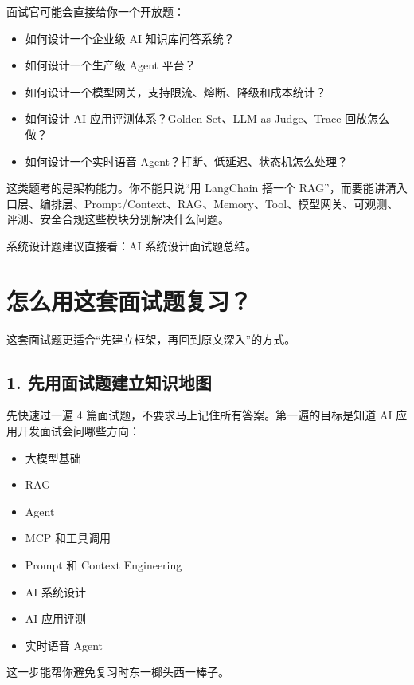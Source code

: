 \documentclass[9pt,a4paper,twocolumn]{ctexart}
\begin{document}
面试官可能会直接给你一个开放题：


\begin{itemize}[itemsep=1pt, topsep=2pt]
  \item 如何设计一个企业级 AI 知识库问答系统？
  \item 如何设计一个生产级 Agent 平台？
  \item 如何设计一个模型网关，支持限流、熔断、降级和成本统计？
  \item 如何设计 AI 应用评测体系？Golden Set、LLM-as-Judge、Trace 回放怎么做？
  \item 如何设计一个实时语音 Agent？打断、低延迟、状态机怎么处理？
\end{itemize}


这类题考的是架构能力。你不能只说“用 LangChain 搭一个 RAG”，而要能讲清入口层、编排层、Prompt/Context、RAG、Memory、Tool、模型网关、可观测、评测、安全合规这些模块分别解决什么问题。



系统设计题建议直接看：AI 系统设计面试题总结。



\section*{怎么用这套面试题复习？}


这套面试题更适合“先建立框架，再回到原文深入”的方式。



\subsection*{1. 先用面试题建立知识地图}


先快速过一遍 4 篇面试题，不要求马上记住所有答案。第一遍的目标是知道 AI 应用开发面试会问哪些方向：


\begin{itemize}[itemsep=1pt, topsep=2pt]
  \item 大模型基础
  \item RAG
  \item Agent
  \item MCP 和工具调用
  \item Prompt 和 Context Engineering
  \item AI 系统设计
  \item AI 应用评测
  \item 实时语音 Agent
\end{itemize}


这一步能帮你避免复习时东一榔头西一棒子。
\end{document}
